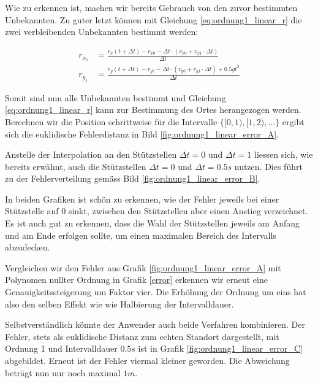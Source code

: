 Wie zu erkennen ist, machen wir bereits Gebrauch von den zuvor bestimmten Unbekannten. Zu guter letzt können mit Gleichung \ref{eq:ordnung1_linear_r} die zwei verbleibenden Unbekannten bestimmt werden:

\begin{equation}
\label{eq:ordnung1_linear_solutionPart3}
\begin{aligned}
r_{x_1} &= \frac{r_x(t + \Delta t) - r_{x0} - \Delta t \cdot(v_{x0} + v_{x1}  \cdot \Delta t)}{\Delta t} \\
r_{y_1} &= \frac{r_y(t + \Delta t) - r_{y0} - \Delta t \cdot(v_{y0} + v_{y1}  \cdot \Delta t) + 0.5gt^2}{\Delta t}
\end{aligned}
\end{equation}


Somit sind nun alle Unbekannten bestimmt und Gleichung \eqref{eq:ordnung1_linear_r} kann zur Bestimmung des Ortes herangezogen werden. Berechnen wir die Position schrittweise für die Intervalle $\{[0,1), [1, 2), \dots\}$ ergibt sich die euklidische Fehlerdistanz in Bild \ref{fig:ordnung1_linear_error_A}.

Anstelle der Interpolation an den Stützstellen $\Delta t = 0$ und $\Delta t = 1$ liessen sich, wie bereits erwähnt, auch die Stützstellen $\Delta t = 0$ und $\Delta t = 0.5s$ nutzen. Dies führt zu der Fehlerverteilung gemäss Bild \ref{fig:ordnung1_linear_error_B}.

In beiden Grafiken ist schön zu erkennen, wie der Fehler jeweils bei einer Stützstelle auf $0$ sinkt, zwischen den Stützstellen aber einen Anstieg verzeichnet. Es ist auch gut zu erkennen, dass die Wahl der Stützstellen jeweils am Anfang und am Ende erfolgen sollte, um einen maximalen Bereich des Intervalls abzudecken. 

Vergleichen wir den Fehler aus Grafik \ref{fig:ordnung1_linear_error_A} mit Polynomen nullter Ordnung in Grafik \ref{error} erkennen wir erneut eine Genauigkeitssteigerung um Faktor vier. Die Erhöhung der Ordnung um eins hat also den selben Effekt wie wie Halbierung der Intervalldauer.

Selbstverständlich könnte der Anwender auch beide Verfahren kombinieren. Der Fehler, stets als euklidische Distanz zum echten Standort dargestellt, mit Ordnung 1 und Intervalldauer $0.5s$ ist in Grafik \ref{fig:ordnung1_linear_error_C} abgebildet. Erneut ist der Fehler viermal kleiner geworden. Die Abweichung beträgt nun nur noch maximal $1m$.

